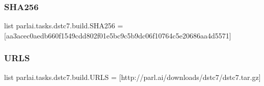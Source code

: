\subsubsection{\texorpdfstring{S\+H\+A256}{SHA256}}
{\footnotesize\ttfamily list parlai.\+tasks.\+dstc7.\+build.\+S\+H\+A256 = \mbox{[}\textquotesingle{}aa3acec0aedb660f1549cdd802f01e5bc9c5b9dc06f10764c5e20686aa4d5571\textquotesingle{}\mbox{]}}

\mbox{\label{namespaceparlai_1_1tasks_1_1dstc7_1_1build_a4cbf3787ad68b1a3383bb9f2c35ead40}} 
\subsubsection{\texorpdfstring{U\+R\+LS}{URLS}}
{\footnotesize\ttfamily list parlai.\+tasks.\+dstc7.\+build.\+U\+R\+LS = \mbox{[}\textquotesingle{}http\+://parl.\+ai/downloads/dstc7/dstc7.\+tar.\+gz\textquotesingle{}\mbox{]}}

